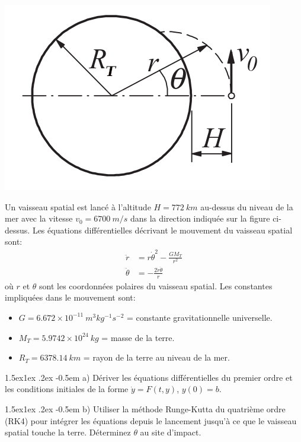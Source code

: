 \documentclass[%
oneside,                 %
final,                   %
10pt,french]{article}
\makeatletter
\newenvironment{doconceexercise}{}{}
\newcounter{doconceexercisecounter}
\newcommand\subex{\@startsection{paragraph}{4}{\z@}%
                  {1.5ex\@plus1ex \@minus.2ex}%
                  {-0.5em}%
                  {\normalfont\normalsize\bfseries}}
\makeatother
\begin{document}
\begin{doconceexercise}





\vspace{6mm}

\centerline{\includegraphics[width=0.4\linewidth]{imgs/spacecraft.png}}

\vspace{6mm}



Un vaisseau spatial est lancé à l'altitude $H = 772 \ km$ au-dessus du niveau de la mer avec la vitesse $v_0 = 6700 \ m/s$ dans la direction indiquée sur la figure ci-dessus. Les équations différentielles décrivant le mouvement du vaisseau spatial sont:
\begin{align*}
\ddot{r} &= r \dot{\theta}^2 - \frac{G M_T}{r^2} \\
\ddot{\theta} &= - \frac{2 \dot{r} \dot{\theta}}{r}
\end{align*}
où $r$ et $\theta$ sont les coordonnées polaires du vaisseau spatial. Les constantes impliquées dans le mouvement sont:
\begin{itemize}
\item $G = 6.672 \times 10^{−11} \ m^3 kg^{−1} s^{−2}$ = constante gravitationnelle universelle.

\item $M_T = 5.9742 \times 10^{24} \ kg$ = masse de la terre.

\item $R_T = 6378.14 \ km$ = rayon de la terre au niveau de la mer.
\end{itemize}

\noindent
\subex{a)}
Dériver les équations différentielles du premier ordre et les conditions initiales de la forme $\dot{y} = F (t, y)$, $y(0) = b$.

\subex{b)}
Utiliser la méthode Runge-Kutta du quatrième ordre (RK4) pour intégrer les équations depuis le lancement jusqu'à ce que le vaisseau spatial touche la terre. Déterminez $\theta$ au site d'impact.

\end{doconceexercise}



\end{document}
